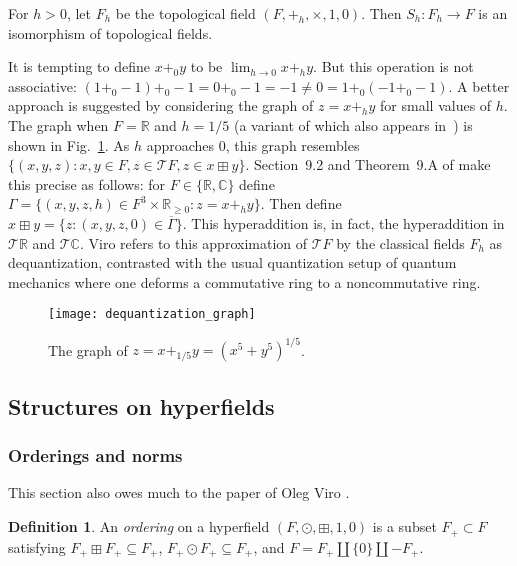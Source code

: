 \documentclass[10pt, preprint]{article}
\theoremstyle{definition}
\newtheorem{definition}[theorem]{Definition}
\begin{document}
For $ h > 0$, let $F_{h}$ be the topological field $(F,+_{h}, \times
, 1,0)$. Then $S_{h} : F_{h} \to F$ is an isomorphism of topological
fields.

It is tempting to define $x+_{0}y$ to be $\lim _{h\to 0}x+_{h}y$. But
this operation is not associative: $(1+_{0}-1)+_{0}-1=0+_{0}-1=-1
\neq 0=1+_{0}(-1+_{0} -1) $. A better approach is suggested by
considering the graph of $z=x+_{h}y$ for small values of $h$. The graph
when $F=\mathbb{R}$ and $h=1/5$ (a variant of which also appears
in~\cite{Connes-Consani}) is shown in
Fig.~\ref{fig:dequantization}.
As $h$ approaches 0, this graph resembles $\{(x,y,z): x,y\in F, z
\in \mathcal{T }F, z \in x \boxplus y\}$. Section~9.2 and Theorem~9.A
of \cite{Viro} make this precise as follows: for $F\in \{
\mathbb{R}, \mathbb{C}\}$ define $\Gamma =\{(x,y,z,h)\in F^{3}\times
\mathbb{R}_{\geq 0}:z=x +_{h} y\}$. Then define $x\boxplus y=\{z: (x,y,z,0)
\in \overline{\Gamma }\}$. This hyperaddition is, in fact, the
hyperaddition in $\mathcal{T }\mathbb{R}$ and $\mathcal{T }\mathbb{C}$.
Viro refers to this approximation of $\mathcal{T }F$ by the classical
fields $F_{h}$ as dequantization, contrasted with the usual quantization
setup of quantum mechanics where one deforms a commutative ring to a
noncommutative ring.

%
\begin{figure}
\texttt{[image: dequantization\_graph]}
\caption{The graph of $z = x+_{1/5} y = (x^5 + y^5)^{1/5}$.}
\label{fig:dequantization}
\end{figure}
%

\subsection{Structures on hyperfields}

\subsubsection{Orderings and norms}%
\label{sec:orderings_and_norms}

This section also owes much to the paper of Oleg Viro
\cite{Viro}.

\begin{definition}
An \emph{ordering} on a hyperfield $(F, \odot , \boxplus , 1, 0)$ is a
subset $F_{+} \subset F$ satisfying $F_{+} \boxplus F_{+} \subseteq F
_{+}$, $F_{+} \odot F_{+} \subseteq F_{+}$, and $F = F_{+} \coprod \{
0 \} \coprod -F_{+}$.
\end{definition}
\end{document}
